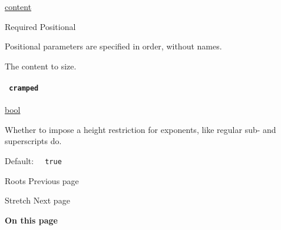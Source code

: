 \href{/docs/reference/foundations/content/}{content}

{Required} {{ Positional }}

\label{functions-sscript-body-positional-tooltip}
Positional parameters are specified in order, without names.

The content to size.

\paragraph{\texorpdfstring{\texttt{\ cramped\ }}{ cramped }}\label{functions-sscript-cramped}

\href{/docs/reference/foundations/bool/}{bool}

Whether to impose a height restriction for exponents, like regular sub-
and superscripts do.

Default: \texttt{\ }{\texttt{\ true\ }}\texttt{\ }

\href{/docs/reference/math/roots/}{\pandocbounded{}}

{ Roots } { Previous page }

\href{/docs/reference/math/stretch/}{\pandocbounded{}}

{ Stretch } { Next page }

\textbf{On this page}

